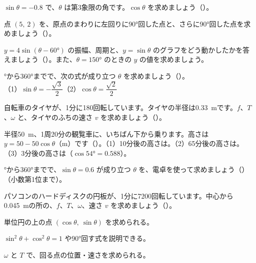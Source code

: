 \bkproblem $\sin\theta=-0.8$ で、$\theta$ は第3象限の角です。$\cos\theta$ を求めましょう\mbox{（）}。

\bkproblem 点 $(5,\ 2)$ を、原点のまわりに左回りに90°回した点と、さらに90°回した点を求めましょう\mbox{（）}。

\bkproblem $y=4\sin(\theta-60°)$ の振幅、周期と、$y=\sin\theta$ のグラフをどう動かしたかを答えましょう\mbox{（）}。また、$\theta=150°$ のときの $y$ の値を求めましょう。

°から360°までで、次の式が成り立つ $\theta$ を求めましょう\mbox{（）}。\\（1）$\sin\theta=-\dfrac{\sqrt3}{2}$\quad（2）$\cos\theta=\dfrac{\sqrt2}{2}$

\bkproblem 自転車のタイヤが、1分に180回転しています。タイヤの半径は\qty{0.33}{m}です。$f$、$T$、$\omega$ と、タイヤのふちの速さ $v$ を求めましょう\mbox{（）}。


\bkproblem 半径\qty{50}{m}、1周20分の観覧車に、いちばん下から乗ります。高さは $y=50-50\cos\theta$（m）です\mbox{（）}。（1）10分後の高さは。（2）65分後の高さは。（3）3分後の高さは（$\cos54°=0.588$）。

°から360°までで、$\sin\theta=0.6$ が成り立つ $\theta$ を、電卓を使って求めましょう\mbox{（）}（小数第1位まで）。

\bkproblem パソコンのハードディスクの円板が、1分に7200回転しています。中心から\qty{0.045}{m}の所の、$f$、$T$、$\omega$、速さ $v$ を求めましょう\mbox{（）}。

\begin{furikaeri}
\begin{checklist}
\item 単位円の上の点 $(\cos\theta,\ \sin\theta)$ を求められる。
\item $\sin^2\theta+\cos^2\theta=1$ や90°回す式を説明できる。
\item $\omega$ と $T$ で、回る点の位置・速さを求められる。
\end{checklist}
\end{furikaeri}

